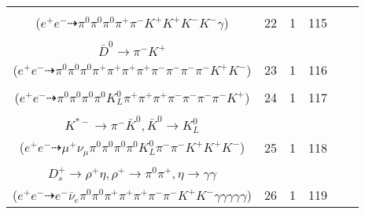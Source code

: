\documentclass[landscape]{article}
\newcounter{rownumbers}
\newcommand\rn{\stepcounter{rownumbers}\arabic{rownumbers}}
\newcommand{\EOLP}{\\ \hline} %
\newcommand{\topoTags}[1]{#1} %
\begin{document}
\begin{longtable}{clcccc}
\rn & \makecell[l]{ $ 
e^{+} e^{-} \rightarrow K^{*-} \bar{D}^{*0} D_{s}^{*+} ,
K^{*-} \rightarrow \pi^{0} K^{-} ,
\bar{D}^{*0} \rightarrow \pi^{0} \bar{D}^{0} ,
D_{s}^{*+} \rightarrow D_{s}^{+} \gamma ,
\bar{D}^{0} \rightarrow \pi^{0} \pi^{-} K^{+} ,
D_{s}^{+} \rightarrow \pi^{+} K^{+} K^{-} 
$ \\ ($
e^{+} e^{-} \dashrightarrow \pi^{0} \pi^{0} \pi^{0} \pi^{+} \pi^{-} K^{+} K^{+} K^{-} K^{-} \gamma 
$) } & \topoTags{22 & }1 & 115 \EOLP

\rn & \makecell[l]{ $ 
e^{+} e^{-} \rightarrow \rho^{0} \pi^{-} \rho^{+} D^{*+} D^{*-} ,
\rho^{0} \rightarrow \pi^{+} \pi^{-} ,
\rho^{+} \rightarrow \pi^{0} \pi^{+} ,
D^{*+} \rightarrow \pi^{+} D^{0} ,
D^{*-} \rightarrow \pi^{-} \bar{D}^{0} ,
D^{0} \rightarrow \pi^{0} \pi^{0} \pi^{+} K^{-} ,
$ \\ $
\bar{D}^{0} \rightarrow \pi^{-} K^{+} 
$ \\ ($
e^{+} e^{-} \dashrightarrow \pi^{0} \pi^{0} \pi^{0} \pi^{+} \pi^{+} \pi^{+} \pi^{+} \pi^{-} \pi^{-} \pi^{-} \pi^{-} K^{+} K^{-} 
$) } & \topoTags{23 & }1 & 116 \EOLP

\rn & \makecell[l]{ $ 
e^{+} e^{-} \rightarrow \pi^{-} \omega D^{+} \bar{D}^{*0} ,
\omega \rightarrow \pi^{0} \pi^{+} \pi^{-} ,
D^{+} \rightarrow \pi^{0} K_{L}^{0} \pi^{+} ,
\bar{D}^{*0} \rightarrow \pi^{0} \bar{D}^{0} ,
\bar{D}^{0} \rightarrow \pi^{-} \omega K^{+} ,
\omega \rightarrow \pi^{0} \pi^{+} \pi^{-} 
$ \\ ($
e^{+} e^{-} \dashrightarrow \pi^{0} \pi^{0} \pi^{0} \pi^{0} K_{L}^{0} \pi^{+} \pi^{+} \pi^{+} \pi^{-} \pi^{-} \pi^{-} \pi^{-} K^{+} 
$) } & \topoTags{24 & }1 & 117 \EOLP

\rn & \makecell[l]{ $ 
e^{+} e^{-} \rightarrow K^{-} K^{*+} D^{*0} \bar{D}^{*0} ,
K^{*+} \rightarrow \pi^{0} K^{+} ,
D^{*0} \rightarrow \pi^{0} D^{0} ,
\bar{D}^{*0} \rightarrow \pi^{0} \bar{D}^{0} ,
D^{0} \rightarrow \mu^{+} \nu_{\mu} K^{*-} ,
\bar{D}^{0} \rightarrow \pi^{0} \pi^{-} K^{+} ,
$ \\ $
K^{*-} \rightarrow \pi^{-} \bar{K}^{0} ,
\bar{K}^{0} \rightarrow K_{L}^{0} 
$ \\ ($
e^{+} e^{-} \dashrightarrow \mu^{+} \nu_{\mu} \pi^{0} \pi^{0} \pi^{0} \pi^{0} K_{L}^{0} \pi^{-} \pi^{-} K^{+} K^{+} K^{-} 
$) } & \topoTags{25 & }1 & 118 \EOLP

\rn & \makecell[l]{ $ 
e^{+} e^{-} \rightarrow \pi^{+} \pi^{-} \eta \bar{K}^{*} D^{*-} D_{s}^{*+} ,
\eta \rightarrow \gamma \gamma ,
\bar{K}^{*} \rightarrow \pi^{+} K^{-} ,
D^{*-} \rightarrow \pi^{-} \bar{D}^{0} ,
D_{s}^{*+} \rightarrow D_{s}^{+} \gamma ,
\bar{D}^{0} \rightarrow e^{-} \bar{\nu}_{e} \pi^{0} K^{+} ,
$ \\ $
D_{s}^{+} \rightarrow \rho^{+} \eta ,
\rho^{+} \rightarrow \pi^{0} \pi^{+} ,
\eta \rightarrow \gamma \gamma 
$ \\ ($
e^{+} e^{-} \dashrightarrow e^{-} \bar{\nu}_{e} \pi^{0} \pi^{0} \pi^{+} \pi^{+} \pi^{+} \pi^{-} \pi^{-} K^{+} K^{-} \gamma \gamma \gamma \gamma \gamma 
$) } & \topoTags{26 & }1 & 119 \EOLP


\end{longtable}
\end{document}
